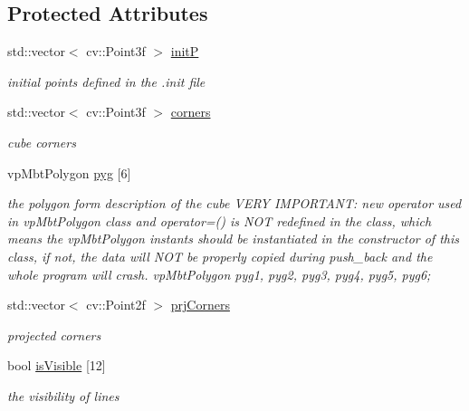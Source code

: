 \subsection*{\-Protected \-Attributes}
\begin{DoxyCompactItemize}
\item 
\hypertarget{classcadModel_ac7ac8e5a375d41ac95656c8a2438b90d}{std\-::vector$<$ cv\-::\-Point3f $>$ \hyperlink{classcadModel_ac7ac8e5a375d41ac95656c8a2438b90d}{init\-P}}\label{classcadModel_ac7ac8e5a375d41ac95656c8a2438b90d}

\begin{DoxyCompactList}\small\item\em initial points defined in the .init file \end{DoxyCompactList}\item 
\hypertarget{classcadModel_acf0b2add55902c0907a078c25fadfe29}{std\-::vector$<$ cv\-::\-Point3f $>$ \hyperlink{classcadModel_acf0b2add55902c0907a078c25fadfe29}{corners}}\label{classcadModel_acf0b2add55902c0907a078c25fadfe29}

\begin{DoxyCompactList}\small\item\em cube corners \end{DoxyCompactList}\item 
\hypertarget{classcadModel_a7d30fddd86ee74149d068d8c6d0e48ba}{vp\-Mbt\-Polygon \hyperlink{classcadModel_a7d30fddd86ee74149d068d8c6d0e48ba}{pyg} \mbox{[}6\mbox{]}}\label{classcadModel_a7d30fddd86ee74149d068d8c6d0e48ba}

\begin{DoxyCompactList}\small\item\em the polygon form description of the cube \-V\-E\-R\-Y \-I\-M\-P\-O\-R\-T\-A\-N\-T\-: new operator used in vp\-Mbt\-Polygon class and operator=() is \-N\-O\-T redefined in the class, which means the vp\-Mbt\-Polygon instants should be instantiated in the constructor of this class, if not, the data will \-N\-O\-T be properly copied during push\-\_\-back and the whole program will crash. vp\-Mbt\-Polygon pyg1, pyg2, pyg3, pyg4, pyg5, pyg6; \end{DoxyCompactList}\item 
\hypertarget{classcadModel_a7f45063fc6ec2c0a888180667c995c6d}{std\-::vector$<$ cv\-::\-Point2f $>$ \hyperlink{classcadModel_a7f45063fc6ec2c0a888180667c995c6d}{prj\-Corners}}\label{classcadModel_a7f45063fc6ec2c0a888180667c995c6d}

\begin{DoxyCompactList}\small\item\em projected corners \end{DoxyCompactList}\item 
\hypertarget{classcadModel_a6891929e69df8b901c2d6a188e83e281}{bool \hyperlink{classcadModel_a6891929e69df8b901c2d6a188e83e281}{is\-Visible} \mbox{[}12\mbox{]}}\label{classcadModel_a6891929e69df8b901c2d6a188e83e281}

\begin{DoxyCompactList}\small\item\em the visibility of lines \end{DoxyCompactList}\end{DoxyCompactItemize}


